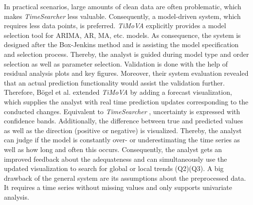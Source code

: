 \documentclass[electronic]{vgtc}             %
\begin{document}
In practical scenarios, large amounts of clean data are often problematic, which makes \textit{TimeSearcher} \cite{buono:2007} less valuable.
Consequently, a model-driven system, which requires less data points, is preferred.
\textit{TiMoVA} \cite{boegl:2013} explicitly provides a model selection tool for  ARIMA, AR, MA, etc. models.
As consequence, the system is designed after the Box-Jenkins method and is assisting the model specification and selection process.
Thereby, the analyst is guided during model type and order selection as well as parameter selection.
Validation is done with the help of residual analysis plots and key figures.
Moreover, their system evaluation revealed that an actual prediction functionality would assist the validation further.
Therefore, B\"ogel et al. \cite{boegl:2014} extended \textit{TiMoVA} by adding a forecast visualization, which supplies the analyst with real time prediction updates corresponding to the conducted changes.
Equivalent to \textit{TimeSearcher} \cite{buono:2007}, uncertainty is expressed with confidence bands. 
Additionally, the difference between true and predicted values as well as the direction (positive or negative) is visualized.
Thereby, the analyst can judge if the model is constantly over- or underestimating the time series as well as how long and often this occurs.
Consequently, the analyst gets an improved feedback about the adequateness and can
simultaneously use the updated visualization to search for global or local trends (Q2)(Q3).
A big drawback of the general system are its assumptions about the preprocessed data. 
It requires a time series without missing values and only supports univariate analysis.
\end{document}
